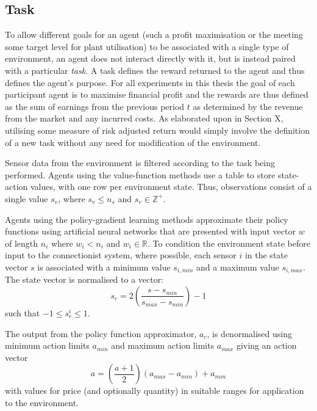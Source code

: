\subsection{Task}
To allow different goals for an agent (such a profit maximisation or the
meeting some target level for plant utilisation) to be associated with a single
type of environment, an agent does not interact directly with it,
but is instead paired with a particular \textit{task}. A task defines the
reward returned to the agent and thus defines the agent's purpose.  For all
experiments in this thesis the goal of each participant agent is to maximise
financial profit and the rewards are thus defined as the sum of earnings from
the previous period $t$ as determined by the revenue from the market and any
incurred costs.  As elaborated upon in Section X, utilising some measure of
risk adjusted return would simply involve the definition of a new task without
any need for modification of the environment.

Sensor data from the environment is filtered according to the task
being performed.  Agents using the value-function methods use a table to store
state-action values, with one row per environment state.  Thus, observations
consist of a single value $s_v$, where $s_v \leq n_s$ and $s_v \in
\mathbb{Z}^+$.

Agents using the policy-gradient learning methods approximate their policy
functions using artificial neural networks that are presented with input vector
$w$ of length $n_i$ where $w_i < n_i$ and $w_i \in \mathbb{R}$.  To condition
the environment state before input to the connectionist system, where possible,
each sensor $i$ in the state vector $s$ is associated with a minimum value
$s_{i,min}$ and a maximum value $s_{i,max}$.   The state vector is normalised
to a vector:
\begin{equation}
s_c = 2\left(\frac{s - s_{min}}{s_{max} - s_{min}}\right) - 1
\end{equation}
such that $-1 \leq s_c^i \leq 1$.

The output from the policy function approximator, $a_c$, is denormalised using
minimum action limits $a_{min}$ and maximum action limits $a_{max}$ giving an action vector
\begin{equation}
a = \left(\frac{a + 1}{2}\right)(a_{max} - a_{min}) + a_{min}
\end{equation}
with values for price (and optionally quantity) in suitable ranges for
application to the environment.


